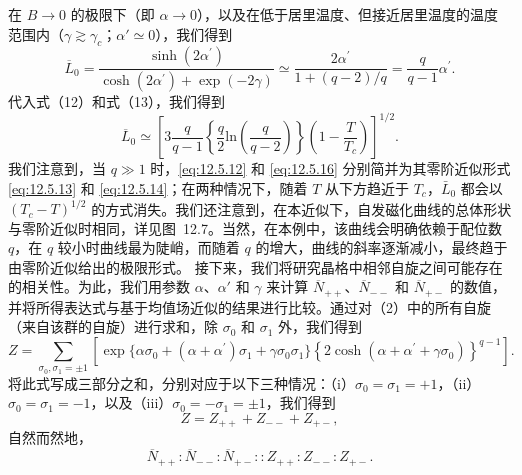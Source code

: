 在 \(B \to 0\) 的极限下（即 \(\alpha \to 0\)），以及在低于居里温度、但接近居里温度的温度范围内（\(\gamma \gtrsim \gamma_c\)；\(\alpha' \simeq 0\)），我们得到
\begin{equation}\tag{12.5.46}\label{eq:12.5.46}
\overline { { L } } _ { 0 } = \frac { \sinh ( 2 \alpha ^{\prime} ) } { \cosh ( 2 \alpha ^{\prime} ) + \exp ( - 2 \gamma ) } \simeq \frac { 2 \alpha ^{\prime} } { 1 + ( q - 2 ) / q } = \frac { q } { q - 1 } \alpha ^{\prime} .
\end{equation}
代入式（12）和式（13），我们得到
\begin{equation}\tag{12.5.47}\label{eq:12.5.47}
\overline { { L } } _ { 0 } \simeq \left[ 3 \frac { q } { q - 1 } \left\{ \frac { q } { 2 } \mathrm { l n } \left( \frac { q } { q - 2 } \right) \right\} \left( 1 - \frac { T } { T _ { c } } \right) \right] ^{1 / 2} .
\end{equation}
我们注意到，当 \(q \gg 1\) 时，\autoref{eq:12.5.12} 和 \autoref{eq:12.5.16} 分别简并为其零阶近似形式 \autoref{eq:12.5.13} 和 \autoref{eq:12.5.14}；在两种情况下，随着 \(T\) 从下方趋近于 \(T_c\)，\(\bar{L}_0\) 都会以 \((T_c - T)^{1/2}\) 的方式消失。我们还注意到，在本近似下，自发磁化曲线的总体形状与零阶近似时相同，详见图~12.7。当然，在本例中，该曲线会明确依赖于配位数 \(q\)，在 \(q\) 较小时曲线最为陡峭，而随着 \(q\) 的增大，曲线的斜率逐渐减小，最终趋于由零阶近似给出的极限形式。
接下来，我们将研究晶格中相邻自旋之间可能存在的相关性。为此，我们用参数 \(\alpha\)、\(\alpha'\) 和 \(\gamma\) 来计算 \(\overline{N}_{++}\)、\(\overline{N}_{--}\) 和 \(\overline{N}_{+-}\) 的数值，并将所得表达式与基于均值场近似的结果进行比较。通过对（2）中的所有自旋（来自该群的自旋）进行求和，除 \(\sigma_0\) 和 \(\sigma_1\) 外，我们得到
\begin{equation}\tag{12.5.48}\label{eq:12.5.48}
Z = \sum _ { \sigma _ { 0 } , \sigma _ { 1 } = \pm 1 } \left[ \exp \{ \alpha \sigma _ { 0 } + ( \alpha + \alpha ^{\prime} ) \sigma _ { 1 } + \gamma \sigma _ { 0 } \sigma _ { 1 } \} \left\{ 2 \cosh ( \alpha + \alpha ^{\prime} + \gamma \sigma _ { 0 } ) \right\} ^{q - 1} \right] .
\end{equation}
将此式写成三部分之和，分别对应于以下三种情况：（i）\(\sigma_{0}=\sigma_{1}=+1\)，（ii）\(\sigma_{0}=\sigma_{1}=-1\)，以及（iii）\(\sigma_{0}=-\sigma_{1}=\pm1\)，我们得到
\begin{equation}\tag{12.5.49}\label{eq:12.5.49}
Z = Z _ { + + } + Z _ { -- } + Z _ { + - } ,
\end{equation}
自然而然地，
\begin{equation}\tag{12.5.50}\label{eq:12.5.50}
\overline { { N } } _ { + + } : \overline { { N } } _ { -- } : \overline { { N } } _ { + - } : : Z _ { + + } : Z _ { -- } : Z _ { + - } .
\end{equation}

